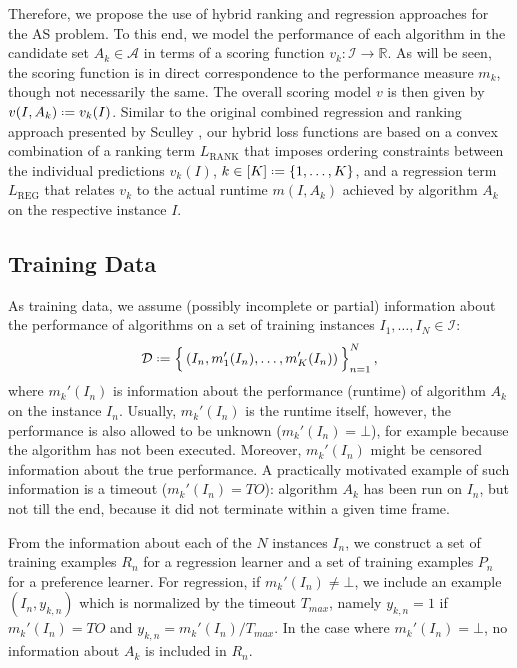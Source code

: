 \documentclass[runningheads]{llncs}
\newcommand*{\defeq}{\mathrel{\vcenter{\baselineskip0.5ex \lineskiplimit0pt
			\hbox{\footnotesize.}\hbox{\footnotesize.}}}%
	=}
\begin{document}
Therefore, we propose the use of hybrid ranking and regression approaches for the AS problem. To this end, we model the performance of each algorithm in the candidate set $A_k \in \mathcal{A}$ in terms of a scoring function $v_k \colon \mathcal{I} \to \mathbb{R}$. As will be seen, the scoring function is in direct correspondence to the performance measure $m_k$, though not necessarily the same. The overall scoring model $v$ is then given by $v(I ,A_k) \defeq v_k(I)$. 
Similar to the original combined regression and ranking approach presented by Sculley \cite{combined_ranking_and_regression_sculley10}, our hybrid loss functions are based on a convex combination of a ranking term $L_\text{RANK}$ that imposes ordering constraints between the individual predictions $v_k(I)$, $k \in [K] \defeq \{1, \ldots , K \}$, and a regression term $L_\text{REG}$ that relates $v_k$ to the actual runtime $m(I,A_k)$ achieved by algorithm $A_k$ on the respective instance $I$. 


\subsection{Training Data}

As training data, we assume (possibly incomplete or partial) information about the performance of algorithms on a set of training instances $I_1, \ldots , I_N \in \mathcal{I}$:
\begin{equation}
    \mathcal{D} \defeq \Big\{ \left( I_n, m_1'(I_n) , \ldots , m_K'(I_n) \right) \Big\}_{n=1}^N   \, , 
\end{equation}
where $m_k'(I_n)$ is information about the performance (runtime) of algorithm $A_k$ on the instance $I_n$. Usually, $m_k'(I_n)$ is the runtime itself, however, the performance is also allowed to be unknown ($m_k'(I_n) = \bot$), for example because the algorithm has not been executed. Moreover, $m_k'(I_n)$ might be censored information about the true performance. A practically motivated example of such information is a timeout ($m_k'(I_n) = TO$): algorithm $A_k$ has been run on $I_n$, but not till the end, because it did not terminate within a given time frame.    

From the information about each of the $N$ instances $I_n$, we construct a set of training examples $R_n$ for a regression learner and a set of training examples $P_n$ for a preference learner. For regression, if $m_k'(I_n) \neq \bot$, we include an example $(I_n, y_{k,n})$ which is normalized by the timeout $T_{max}$, namely $y_{k,n} = 1$ if $m_k'(I_n) = TO$ and $y_{k,n} = m_k'(I_n)/T_{max}$. In the case where $m_k'(I_n) = \bot$, no information about $A_k$ is included in $R_n$.
\end{document}
